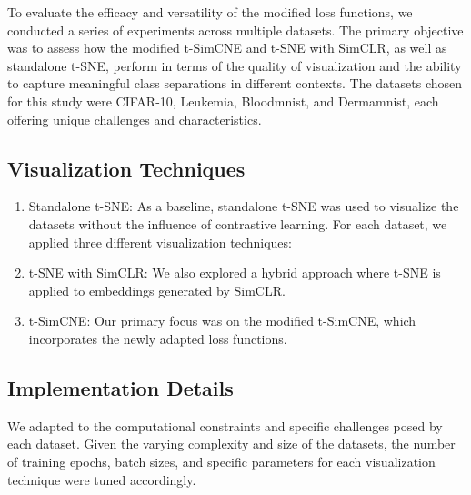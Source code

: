 To evaluate the efficacy and versatility of the modified loss functions, we conducted a series of experiments across multiple datasets. The primary objective was to assess how the modified t-SimCNE and t-SNE with SimCLR, as well as standalone t-SNE, perform in terms of the quality of visualization and the ability to capture meaningful class separations in different contexts. The datasets chosen for this study were CIFAR-10, Leukemia, Bloodmnist, and Dermamnist, each offering unique challenges and characteristics.

\subsection{Visualization Techniques}
\begin{enumerate}
\item {Standalone t-SNE}: As a baseline, standalone t-SNE was used to visualize the datasets without the influence of contrastive learning.
For each dataset, we applied three different visualization techniques:
\item {t-SNE with SimCLR}: We also explored a hybrid approach where t-SNE is applied to embeddings generated by SimCLR.
\item {t-SimCNE}: Our primary focus was on the modified t-SimCNE, which incorporates the newly adapted loss functions.
\end{enumerate}

\subsection{Implementation Details}
We adapted to the computational constraints and specific challenges posed by each dataset. Given the varying complexity and size of the datasets, the number of training epochs, batch sizes, and specific parameters for each visualization technique were tuned accordingly.
